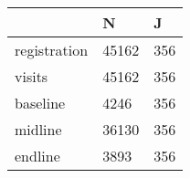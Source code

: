 \begin{table}[htbp]
\begin{tabular}{|l|l|l|}\hline  
 & N  & J  \\ \hline  
registration & 45162 & 356 \\ \hline 
visits & 45162 & 356 \\ \hline 
baseline & 4246 & 356 \\ \hline 
midline & 36130 & 356 \\ \hline 
endline & 3893 & 356 \\ \hline 
  \end{tabular}
\end{table}
